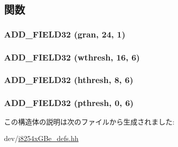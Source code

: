 \subsection{関数}
\hypertarget{structiGbReg_1_1Regs_1_1RXDCTL_acdf2ad81a44f986c1547302a94bbfa34}{
\subsubsection[{ADD\_\-FIELD32}]{\setlength{\rightskip}{0pt plus 5cm}ADD\_\-FIELD32 (gran, \/  24, \/  1)}}
\label{structiGbReg_1_1Regs_1_1RXDCTL_acdf2ad81a44f986c1547302a94bbfa34}
\hypertarget{structiGbReg_1_1Regs_1_1RXDCTL_a352305079deadad339f18b9f60b5791b}{
\subsubsection[{ADD\_\-FIELD32}]{\setlength{\rightskip}{0pt plus 5cm}ADD\_\-FIELD32 (wthresh, \/  16, \/  6)}}
\label{structiGbReg_1_1Regs_1_1RXDCTL_a352305079deadad339f18b9f60b5791b}
\hypertarget{structiGbReg_1_1Regs_1_1RXDCTL_a00a36d9608271e7fc1a9d567898beec9}{
\subsubsection[{ADD\_\-FIELD32}]{\setlength{\rightskip}{0pt plus 5cm}ADD\_\-FIELD32 (hthresh, \/  8, \/  6)}}
\label{structiGbReg_1_1Regs_1_1RXDCTL_a00a36d9608271e7fc1a9d567898beec9}
\hypertarget{structiGbReg_1_1Regs_1_1RXDCTL_acca8f40dfe6ce58aac4678e3b089f191}{
\subsubsection[{ADD\_\-FIELD32}]{\setlength{\rightskip}{0pt plus 5cm}ADD\_\-FIELD32 (pthresh, \/  0, \/  6)}}
\label{structiGbReg_1_1Regs_1_1RXDCTL_acca8f40dfe6ce58aac4678e3b089f191}


この構造体の説明は次のファイルから生成されました:\begin{DoxyCompactItemize}
\item 
dev/\hyperlink{i8254xGBe__defs_8hh}{i8254xGBe\_\-defs.hh}\end{DoxyCompactItemize}
